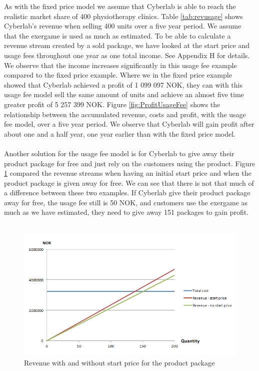As with the fixed price model we assume that Cyberlab is able to reach the realistic market share of 400 physiotherapy clinics. Table \ref{tab:revusage} shows Cyberlab's revenue when selling 400 units over a five year period. We assume that the exergame is used as much as estimated. To be able to calculate a revenue stream created by a sold package, we have looked at the start price and usage fees throughout one year as one total income. See Appendix H for details. We observe that the income increases significantly in this usage fee example compared to the fixed price example. Where we in the fixed price example showed that Cyberlab achieved a profit of 1 099 097 NOK, they can with this usage fee model sell the same amount of units and achieve an almost five time greater profit of 5 257 399 NOK. Figure \ref{fig:ProfitUsageFee} shows the relationship between the accumulated revenue, costs and profit, with the usage fee model, over a five year period. We observe that Cyberlab will gain profit after about one and a half year, one year earlier than with the fixed price model. \\ \\
Another solution for the usage fee model is for Cyberlab to give away their product package for free and just rely on the customers using the product. Figure \ref{fig:UsageWithWithout} compared the revenue streams when having an initial start price and when the product package is given away for free. We can see that there is not that much of a difference between these two examples. If Cyberlab give their product package away for free, the usage fee still is 50 NOK, and customers use the exergame as much as we have estimated, they need to give away 151 packages to gain profit. \\ \\
\begin{figure}
\begin{center}
\includegraphics[scale=0.8]{usagewithwithoutstartprice}
\caption[Usage fee example]{Revenue with and without start price for the product package}
\label{fig:UsageWithWithout}
\end{center}
\end{figure}

